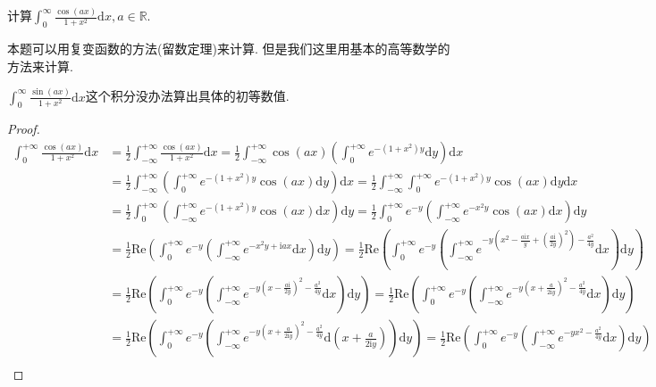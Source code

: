 \documentclass[../../main.tex]{subfiles}%
\begin{document}
\begin{example}
计算$\int_{0}^{\infty}\frac{\cos(ax)}{1 + x^{2}}\mathrm{d}x, a\in\mathbb{R}$. 
\end{example}
\begin{remark}
本题可以用复变函数的方法(留数定理)来计算. 但是我们这里用基本的高等数学的方法来计算.

$\int_0^{\infty}{\frac{\sin \left( ax \right)}{1+x^2}\mathrm{d}x}$这个积分没办法算出具体的初等数值.
\end{remark}
\begin{proof}
\begin{align*}
\int_0^{+\infty}{\frac{\cos \left( ax \right)}{1+x^2}\mathrm{d}x}&=\frac{1}{2}\int_{-\infty}^{+\infty}{\frac{\cos \left( ax \right)}{1+x^2}\mathrm{d}x}=\frac{1}{2}\int_{-\infty}^{+\infty}{\cos \left( ax \right) \left( \int_0^{+\infty}{e^{-\left( 1+x^2 \right) y}\mathrm{d}y} \right) \mathrm{d}x}\\
&=\frac{1}{2}\int_{-\infty}^{+\infty}{\left( \int_0^{+\infty}{e^{-\left( 1+x^2 \right) y}\cos \left( ax \right) \mathrm{d}y} \right) \mathrm{d}x}=\frac{1}{2}\int_{-\infty}^{+\infty}{\int_0^{+\infty}{e^{-\left( 1+x^2 \right) y}\cos \left( ax \right) \mathrm{d}y}}\mathrm{d}x\\
&=\frac{1}{2}\int_0^{+\infty}{\left( \int_{-\infty}^{+\infty}{e^{-\left( 1+x^2 \right) y}\cos \left( ax \right) \mathrm{d}x} \right) \mathrm{d}y}=\frac{1}{2}\int_0^{+\infty}{e^{-y}\left( \int_{-\infty}^{+\infty}{e^{-x^2y}\cos \left( ax \right) \mathrm{d}x} \right)}\mathrm{d}y\\
&=\frac{1}{2}\mathrm{Re}\left( \int_0^{+\infty}{e^{-y}\left( \int_{-\infty}^{+\infty}{e^{-x^2y+\mathrm{i}ax}\mathrm{d}x} \right) \mathrm{d}y} \right) =\frac{1}{2}\mathrm{Re}\left( \int_0^{+\infty}{e^{-y}\left( \int_{-\infty}^{+\infty}{e^{-y\left( x^2-\frac{a\mathrm{i}x}{y}+\left( \frac{a\mathrm{i}}{2y} \right) ^2 \right) -\frac{a^2}{4y}}\mathrm{d}x} \right) \mathrm{d}y} \right) \\
&=\frac{1}{2}\mathrm{Re}\left( \int_0^{+\infty}{e^{-y}\left( \int_{-\infty}^{+\infty}{e^{-y\left( x-\frac{a\mathrm{i}}{2y} \right) ^2-\frac{a^2}{4y}}\mathrm{d}x} \right) \mathrm{d}y} \right) =\frac{1}{2}\mathrm{Re}\left( \int_0^{+\infty}{e^{-y}\left( \int_{-\infty}^{+\infty}{e^{-y\left( x+\frac{a}{2\mathrm{i}y} \right) ^2-\frac{a^2}{4y}}\mathrm{d}x} \right) \mathrm{d}y} \right) \\
&=\frac{1}{2}\mathrm{Re}\left( \int_0^{+\infty}{e^{-y}\left( \int_{-\infty}^{+\infty}{e^{-y\left( x+\frac{a}{2\mathrm{i}y} \right) ^2-\frac{a^2}{4y}}\mathrm{d}\left( x+\frac{a}{2\mathrm{i}y} \right)} \right) \mathrm{d}y} \right) =\frac{1}{2}\mathrm{Re}\left( \int_0^{+\infty}{e^{-y}\left( \int_{-\infty}^{+\infty}{e^{-yx^2-\frac{a^2}{4y}}\mathrm{d}x} \right) \mathrm{d}y} \right) \\

\end{align*}
\end{proof}
\end{document}
